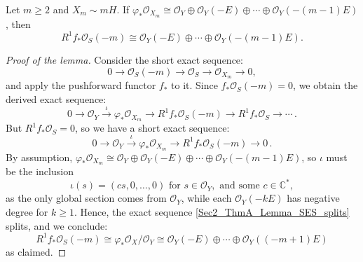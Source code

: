 \documentclass[10pt,a4paper]{amsart}
\begin{document}
\begin{lemma}\label{Lemma_ThmA_(1)=>(2)}
Let $m \geq 2$ and $X_m \sim mH$. If $\varphi_{\ast} \mathcal{O}_{X_m} \cong \mathcal{O}_Y \oplus \mathcal{O}_Y (-E)  \oplus \cdots \oplus \mathcal{O}_Y (-(m-1)E)$, then
\[
R^1 f_{\ast} \mathcal{O}_S (-m) \cong \mathcal{O}_Y (-E) \oplus \cdots \oplus \mathcal{O}_Y (-(m-1)E) .
\]
\end{lemma}

\begin{proof}[Proof of the lemma]
Consider the short exact sequence:
\[
 0 \to \mathcal{O}_S (-m)  \to \mathcal{O}_S \to \mathcal{O}_{X_m} \to 0 ,
\]
and apply the pushforward functor $f_{\ast}$ to it. Since $f_{\ast} \mathcal{O}_S (-m) = 0$, we obtain the derived exact sequence:
\[
 0 \to \mathcal{O}_Y \xrightarrow{\iota} \varphi_{\ast} \mathcal{O}_{X_m} \to R^1 f_{\ast} \mathcal{O}_S (-m)  \to R^1 f_{\ast} \mathcal{O}_S \to \cdots \, .
\]
But $R^1 f_{\ast} \mathcal{O}_S = 0$, so we have a short exact sequence:
\begin{equation}
\label{Sec2_ThmA_Lemma_SES_splits}
  0 \to \mathcal{O}_Y \xrightarrow{\iota} \varphi_{\ast} \mathcal{O}_{X_m} \to R^1 f_{\ast} \mathcal{O}_S (-m)  \to 0 \, .
\end{equation}
%
By assumption, $\varphi_{\ast} \mathcal{O}_{X_m} \cong \mathcal{O}_Y \oplus \mathcal{O}_Y (-E)  \oplus \cdots \oplus \mathcal{O}_Y (-(m-1)E)$, so $\iota$ must be the inclusion
\[
 \iota (s) = (cs, 0, \ldots , 0) \mbox{ for } s \in \mathcal{O}_Y, \mbox{ and some } c \in \mathbb{C}^{\ast},
\]
as the only global section comes from $\mathcal{O}_Y$, while each $\mathcal{O}_Y (-kE)$ has negative degree for $k \geq 1$. Hence, the exact sequence \eqref{Sec2_ThmA_Lemma_SES_splits} splits, and we conclude:
\[
 R^1 f_{\ast} \mathcal{O}_S (-m) \cong \varphi_{\ast} \mathcal{O}_X / \mathcal{O}_Y \cong \mathcal{O}_Y (-E) \oplus \cdots \oplus \mathcal{O}_Y ((-m+1)E)
\]
as claimed.
\end{proof}
\end{document}
